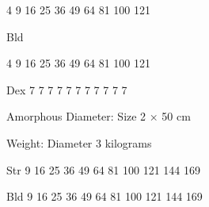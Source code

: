 \documentclass[twoside]{book}
\begin{document}
                    
                    
                   4   
                   9   
                   16   
                   25   
                   36   
                   49   
                   64   
                   81   
                   100   
                   121   
                  
                  
                   Bld   
                  
                    
                    
                   4   
                   9   
                   16   
                   25   
                   36   
                   49   
                   64   
                   81   
                   100   
                   121   
                  
                  
                   Dex   
                   7   
                   7   
                   7   
                   7   
                   7   
                   7   
                   7   
                   7   
                   7   
                   7   
                   7   
                  
                  
                   Amorphous   
                    Diameter:   
                         Size  2 
                             ×  50  cm
                             
                    
                  
                  
                    
                   Weight:   
                         Diameter  3 
                           kilograms     
                    
                  
                  
                   Str   
                   9   
                   16   
                   25   
                   36   
                   49   
                   64   
                   81   
                   100   
                   121   
                   144   
                   169   
                  
                  
                   Bld   
                   9   
                   16   
                   25   
                   36   
                   49   
                   64   
                   81   
                   100   
                   121   
                   144   
                   169   
                  
\end{document}
